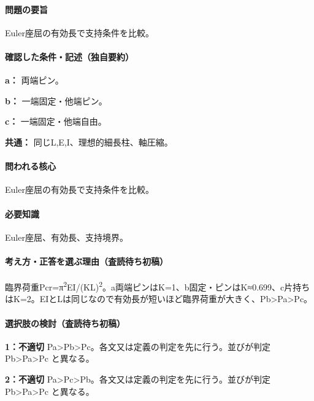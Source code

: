 \paragraph{問題の要旨} Euler座屈の有効長で支持条件を比較。

\paragraph{確認した条件・記述（独自要約）}\mbox{}\par

\noindent\textbf{a：} 両端ピン。\par

\noindent\textbf{b：} 一端固定・他端ピン。\par

\noindent\textbf{c：} 一端固定・他端自由。\par

\noindent\textbf{共通：} 同じL,E,I、理想的細長柱、軸圧縮。\par

\paragraph{問われる核心} Euler座屈の有効長で支持条件を比較。

\paragraph{必要知識} Euler座屈、有効長、支持境界。

\paragraph{考え方・正答を選ぶ理由（査読待ち初稿）} 臨界荷重Pcr=π\textsuperscript{2}EI/(KL)\textsuperscript{2}。a両端ピンはK=\allowbreak{}1、b固定・ピンはK≈0.699、c片持ちはK=\allowbreak{}2。EIとLは同じなので有効長が短いほど臨界荷重が大きく、Pb>Pa>Pc。

\paragraph{選択肢の検討（査読待ち初稿）}\mbox{}\par

\noindent\textbf{1：不適切} Pa>Pb>Pc。各文又は定義の判定を先に行う。並びが判定 Pb>Pa>Pc と異なる。\par

\noindent\textbf{2：不適切} Pa>Pc>Pb。各文又は定義の判定を先に行う。並びが判定 Pb>Pa>Pc と異なる。\par

